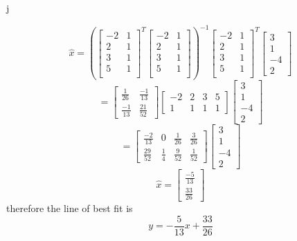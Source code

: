 j\documentclass[12pt]{article}
\begin{document}
\begin{enumerate}
    \[
    \hat{x} = \left( 
    \begin{bmatrix}
        -2&1\\
        2&1\\
        3&1\\
        5&1\\
    \end{bmatrix}^T
    \begin{bmatrix}
        -2&1\\
        2&1\\
        3&1\\
        5&1\\
    \end{bmatrix}
    \right)^{-1}
    \begin{bmatrix}
        -2&1\\
        2&1\\
        3&1\\
        5&1\\
    \end{bmatrix}^T
    \begin{bmatrix}
        3\\1\\-4\\2
    \end{bmatrix}
    \]
    \[
    =
    \begin{bmatrix}
    \frac{1}{26} & \frac{-1}{13} \\
    \frac{-1}{13} & \frac{21}{52}
    \end{bmatrix}
    \begin{bmatrix}
    -2 & 2 & 3 & 5 \\
    1 & 1 & 1 & 1
    \end{bmatrix}
    \begin{bmatrix}
        3\\1\\-4\\2
    \end{bmatrix}
    \]
    \[
    =
    \begin{bmatrix}
    \frac{-2}{13} & 0 & \frac{1}{26} & \frac{3}{26} \\
    \frac{29}{52} & \frac{1}{4} & \frac{9}{52} & \frac{1}{52}
    \end{bmatrix}
    \begin{bmatrix}
        3\\1\\-4\\2
    \end{bmatrix}
    \]
    \[
    \hat{x}=
    \begin{bmatrix}
    \frac{-5}{13} \\
    \frac{33}{26}
    \end{bmatrix}
    \]
    therefore the line of best fit is
    \[
    y = -\frac{5}{13}x + \frac{33}{26}
    \]
    \\ \\ \\ 
 




\end{enumerate}
\end{document}
